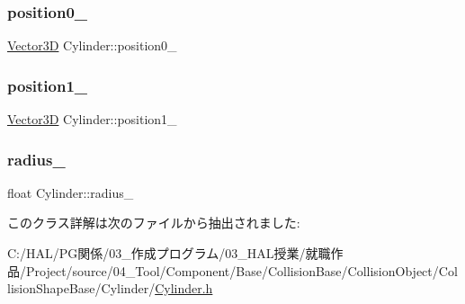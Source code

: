 \subsubsection{\texorpdfstring{position0\+\_\+}{position0\_}}
{\footnotesize\ttfamily \mbox{\hyperlink{class_vector3_d}{Vector3D}} Cylinder\+::position0\+\_\+}

\mbox{\label{class_cylinder_ada317510ac188ea639a0f8613c2b554e}} 
\subsubsection{\texorpdfstring{position1\+\_\+}{position1\_}}
{\footnotesize\ttfamily \mbox{\hyperlink{class_vector3_d}{Vector3D}} Cylinder\+::position1\+\_\+}

\mbox{\label{class_cylinder_abba752e07b11b7bfd8fcce64a6d9b678}} 
\subsubsection{\texorpdfstring{radius\+\_\+}{radius\_}}
{\footnotesize\ttfamily float Cylinder\+::radius\+\_\+}



このクラス詳解は次のファイルから抽出されました\+:\begin{DoxyCompactItemize}
\item 
C\+:/\+H\+A\+L/\+P\+G関係/03\+\_\+作成プログラム/03\+\_\+\+H\+A\+L授業/就職作品/\+Project/source/04\+\_\+\+Tool/\+Component/\+Base/\+Collision\+Base/\+Collision\+Object/\+Collision\+Shape\+Base/\+Cylinder/\mbox{\hyperlink{_cylinder_8h}{Cylinder.\+h}}\end{DoxyCompactItemize}
